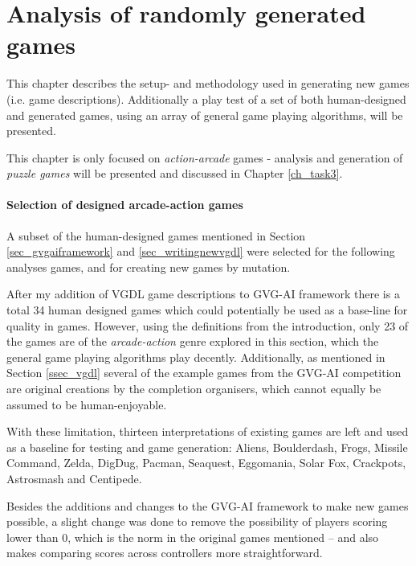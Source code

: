 \documentclass[a4paper,titlepage,final]{report}
\begin{document}

\chapter{Analysis of randomly generated games}
\label{ch_task1}
This chapter describes the setup- and methodology used in generating new games (i.e. game descriptions).
Additionally a play test of a set of both human-designed and generated games, using an array of general game playing algorithms, will be presented.

This chapter is only focused on \textit{action-arcade} games - analysis and generation of \textit{puzzle games} will be presented and discussed in Chapter \ref{ch_task3}.

\subsubsection*{Selection of designed arcade-action games}
A subset of the human-designed games mentioned in Section \ref{sec_gvgaiframework} and \ref{sec_writingnewvgdl} were selected for the following analyses games, and for creating new games by mutation.

After my addition of VGDL game descriptions to GVG-AI framework there is a total 34 human designed games which could potentially be used as a base-line for quality in games. 
However, using the definitions from the introduction, only 23 of the games are of the \textit{arcade-action} genre explored in this section, which the general game playing algorithms play decently.
Additionally, as mentioned in Section \ref{ssec_vgdl} several of the example games from the GVG-AI competition are original creations by the completion organisers, which cannot equally be assumed to be human-enjoyable.

With these limitation, thirteen interpretations of existing games are left and used as a baseline for testing and game generation: Aliens, Boulderdash, Frogs, Missile Command, Zelda, DigDug, Pacman, Seaquest, Eggomania, Solar Fox, Crackpots, Astrosmash and Centipede.

Besides the additions and changes to the GVG-AI framework to make new games possible, a slight change was done to remove the possibility of players scoring lower than 0, which is the norm in the original games mentioned -- and also makes comparing scores across controllers more straightforward.
\end{document}

